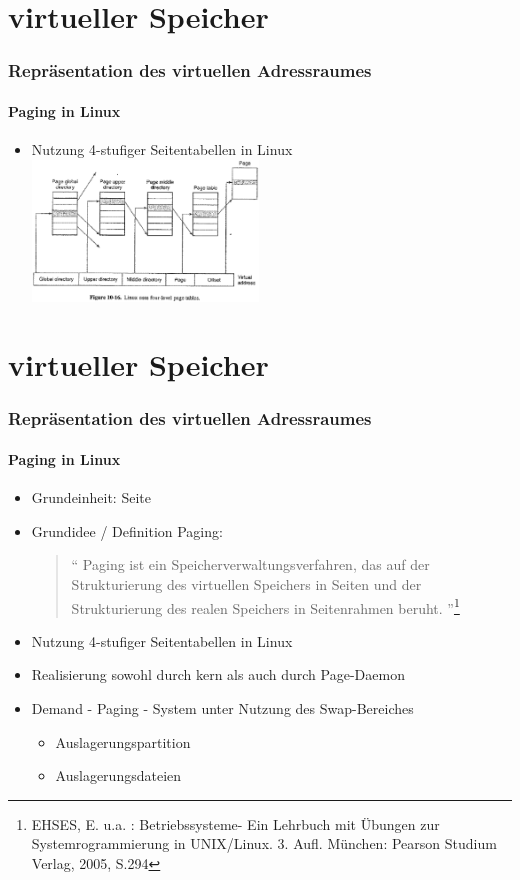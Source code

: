 \documentclass[ddcfooter]{tudbeamer}
\begin{document}
\section{virtueller Speicher}
\begin{frame}
    \frametitle{Repräsentation des virtuellen Adressraumes}
    \framesubtitle {Paging in Linux}
    \begin{itemize}
         \item Nutzung 4-stufiger Seitentabellen in Linux
	\includegraphics[width=6cm]{Seitentab.eps} 		
    
    
     \end{itemize}
    
\end{frame}

\section{virtueller Speicher}
\begin{frame}
    \frametitle{Repräsentation des virtuellen Adressraumes}
    \framesubtitle {Paging in Linux}
    \begin{itemize}
         \item  Grundeinheit: Seite
         \item Grundidee / Definition Paging: \\
        \begin{quote}
         \textquotedblleft
         Paging ist ein Speicherverwaltungsverfahren, das auf der Strukturierung  des virtuellen Speichers 	in Seiten und der Strukturierung des realen Speichers in Seitenrahmen beruht.
    	\textquotedblright \footnote {EHSES, E. u.a. : Betriebssysteme- Ein Lehrbuch mit Übungen zur   	Systemrogrammierung in UNIX/Linux. 3. Aufl. München: Pearson Studium Verlag, 2005, S.294  }
	\end{quote}
 	 \item Nutzung 4-stufiger Seitentabellen in Linux
	 \item Realisierung sowohl durch kern als auch durch Page-Daemon
	 \item Demand - Paging - System unter Nutzung des Swap-Bereiches
	 \begin{itemize}
	 	\item Auslagerungspartition 
		\item Auslagerungsdateien
	\end{itemize}
    
    
     \end{itemize}
    
\end{frame}
\end{document}
